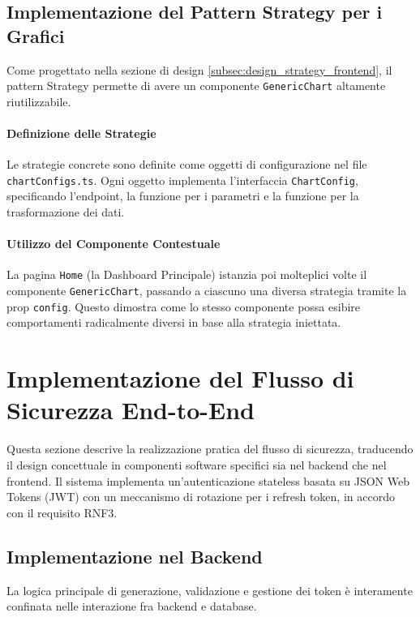 \documentclass[12pt,a4paper,openright,twoside]{book}
\begin{document}
\subsection{Implementazione del Pattern Strategy per i Grafici}
\label{subsec:impl_strategy_frontend}
Come progettato nella sezione di design \ref{subsec:design_strategy_frontend}, il pattern Strategy permette di avere un componente \texttt{GenericChart} altamente riutilizzabile.

\paragraph{Definizione delle Strategie}
Le strategie concrete sono definite come oggetti di configurazione nel file \texttt{chartConfigs.ts}. Ogni oggetto implementa l'interfaccia \texttt{ChartConfig}, specificando l'endpoint, la funzione per i parametri e la funzione per la trasformazione dei dati.

\paragraph{Utilizzo del Componente Contestuale}
La pagina \texttt{Home} (la Dashboard Principale) istanzia poi molteplici volte il componente \texttt{GenericChart}, passando a ciascuno una diversa strategia tramite la prop \texttt{config}. Questo dimostra come lo stesso componente possa esibire comportamenti radicalmente diversi in base alla strategia iniettata.

\section{Implementazione del Flusso di Sicurezza End-to-End}
\label{sec:impl_security}

Questa sezione descrive la realizzazione pratica del flusso di sicurezza, traducendo il design concettuale in componenti software specifici sia nel backend che nel frontend. Il sistema implementa un'autenticazione stateless basata su JSON Web Tokens (JWT) con un meccanismo di rotazione per i refresh token, in accordo con il requisito RNF3.

\subsection{Implementazione nel Backend}
La logica principale di generazione, validazione e gestione dei token è interamente confinata nelle interazione fra backend e database.
\end{document}
